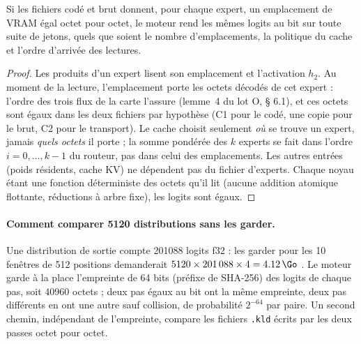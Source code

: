 \begin{proposition}\label{t2res-prop:c3}
Si les fichiers codé et brut donnent, pour chaque expert, un emplacement de VRAM égal octet pour octet, le moteur rend les mêmes logits au bit sur toute suite de jetons, quels que soient le nombre d'emplacements, la politique du cache et l'ordre d'arrivée des lectures.
\end{proposition}
\begin{proof}
Les produits d'un expert lisent son emplacement et l'activation $h_2$. Au moment de la lecture, l'emplacement porte les octets décodés de cet expert : l'ordre des trois flux de la carte l'assure (lemme~4 du lot O,  § 6.1), et ces octets sont égaux dans les deux fichiers par hypothèse (C1 pour le codé, une copie pour le brut, C2 pour le transport). Le cache choisit seulement \emph{où} se trouve un expert, jamais \emph{quels octets} il porte ; la somme pondérée des $k$ experts se fait dans l'ordre $i = 0, \dots, k-1$ du routeur, pas dans celui des emplacements. Les autres entrées (poids résidents, cache KV) ne dépendent pas du fichier d'experts. Chaque noyau étant une fonction déterministe des octets qu'il lit (aucune addition atomique flottante, réductions à arbre fixe), les logits sont égaux.
\end{proof}

\paragraph{Comment comparer \num{5120} distributions sans les garder.} Une distribution de sortie compte \num{201088} logits f32 : les garder pour les 10 fenêtres de 512 positions demanderait $\num{5120} \times \num{201088} \times 4 = \SI{4.12}{\Go}$ \calc. Le moteur garde à la place l'empreinte de 64 bits (préfixe de SHA-256) des logits de chaque pas, soit \num{40960} octets ; deux pas égaux au bit ont la même empreinte, deux pas différents en ont une autre sauf collision, de probabilité $2^{-64}$ par paire. Un second chemin, indépendant de l'empreinte, compare les fichiers \texttt{.kld} écrits par les deux passes octet pour octet.

